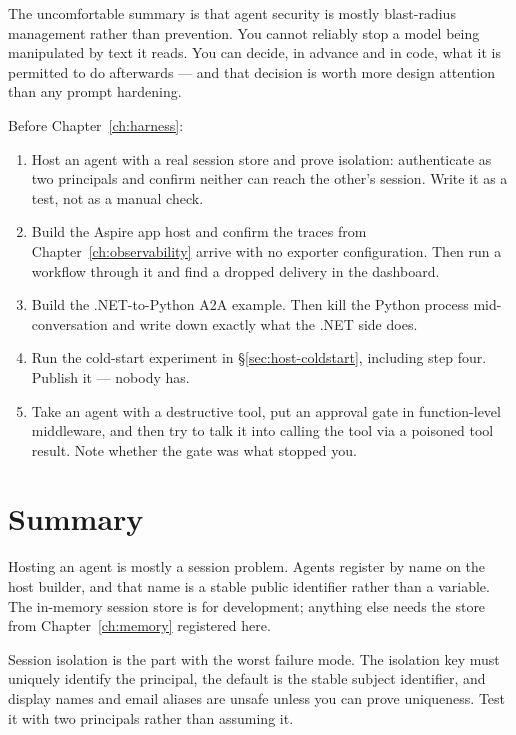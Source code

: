\begin{note}
The uncomfortable summary is that agent security is mostly blast-radius
management rather than prevention. You cannot reliably stop a model being
manipulated by text it reads. You can decide, in advance and in code, what it is
permitted to do afterwards --- and that decision is worth more design attention
than any prompt hardening.
\end{note}

\begin{exercisebox}
Before Chapter~\ref{ch:harness}:

\begin{enumerate}[leftmargin=1.4em]
\item Host an agent with a real session store and prove isolation: authenticate
      as two principals and confirm neither can reach the other's session. Write
      it as a test, not as a manual check.
\item Build the Aspire app host and confirm the traces from
      Chapter~\ref{ch:observability} arrive with no exporter configuration.
      Then run a workflow through it and find a dropped delivery in the
      dashboard.
\item Build the .NET-to-Python A2A example. Then kill the Python process
      mid-conversation and write down exactly what the .NET side does.
\item Run the cold-start experiment in \S\ref{sec:host-coldstart}, including
      step four. Publish it --- nobody has.
\item Take an agent with a destructive tool, put an approval gate in
      function-level middleware, and then try to talk it into calling the tool
      via a poisoned tool result. Note whether the gate was what stopped you.
\end{enumerate}
\end{exercisebox}

\section{Summary}

Hosting an agent is mostly a session problem. Agents register by name on the host
builder, and that name is a stable public identifier rather than a variable. The
in-memory session store is for development; anything else needs the store from
Chapter~\ref{ch:memory} registered here.

Session isolation is the part with the worst failure mode. The isolation key must
uniquely identify the principal, the default is the stable subject identifier,
and display names and email aliases are unsafe unless you can prove uniqueness.
Test it with two principals rather than assuming it.

